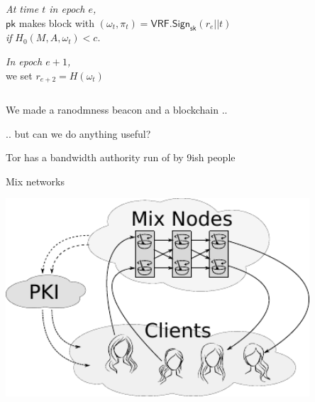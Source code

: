 \documentclass[fleqn,xcolor={usenames,dvipsnames},notes,aspectratio=169]{beamer} %
\newcommand{\algo}[1]{\ensuremath{\mathsf{#1}}}
\newcommand{\VRF}{\algo{VRF}}
\newcommand{\Sign}{\algo{Sign}}
\newcommand{\sk}{\ensuremath{\mathsf{sk}}}
\newcommand{\pk}{\ensuremath{\mathsf{pk}}}
\begin{document}
\begin{frame}
\begin{columns}
\begin{column}{0.65\textwidth}
    \bigskip\bigskip
    
    {\em At time $t$ in epoch $e$,} \\ \hspace*{3pt}
     $\pk$ makes block with $(\omega_t,\pi_t) = \VRF.\Sign_{\sk}(r_e || t)$ \\ \hspace*{3pt}
     {\em if} $H_0(M, A, \omega_t) < c$. %

    \bigskip\bigskip
    {\em In epoch $e+1$,} \\ \hspace*{3pt}
     we set $r_{e+2} = H(\omega_t)$
    
   \end{column}
  \end{columns}

\end{frame}


\begin{frame}

We made a ranodmness beacon and a blockchain ..

\medskip 

\hspace*{3pt} .. but can we do anything useful?

\pause\bigskip\bigskip

Tor has a bandwidth authority run of by 9ish people

\end{frame}




\begin{frame}{Mix networks}
\begin{center}
\includegraphics[width=0.85\textwidth]{../pics/mix/initial}
\end{center}
\end{frame}
\end{document}
